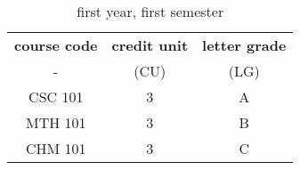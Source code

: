 \documentclass{article}
\begin{document}
	
	\begin{table}[h]
		\begin{center}
			\caption{first year, first semester}
			\label{tab:table}
			\begin{tabular}{c|c|c}
				\textbf{course code} &\textbf{credit unit} &
				\textbf{letter grade}\\
				- & (CU) & (LG) \\
				\hline
				CSC 101 & 3 & A\\
				MTH 101 & 3 & B\\
				CHM 101 & 3 & C\\
				\end{tabular}
			\end{center}
	\end{table}
  
\end{document}
